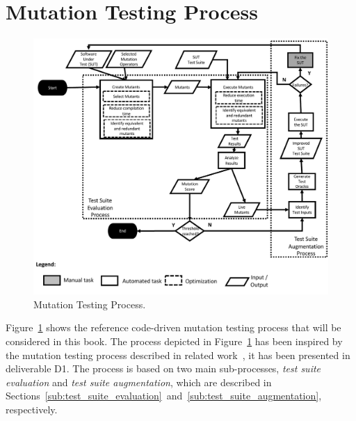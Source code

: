 
\section{Mutation Testing Process}
\label{sec:process}

	\begin{figure}
	\centering
		\includegraphics[width=\textwidth]{images/process}
		\caption{Mutation Testing Process.}
		\label{fig:code:process}
	\end{figure}

Figure~\ref{fig:code:process} shows the reference code-driven mutation testing process that will be considered in this book. The process depicted in Figure~\ref{fig:code:process} has been inspired by the mutation testing process described in related work~\cite{offutt2001mutation,papadakis2019mutation}, it has been presented in deliverable D1. The process is based on two main sub-processes, \emph{test suite evaluation} and \emph{test suite augmentation}, which are described in Sections~\ref{sub:test_suite_evaluation}~and~\ref{sub:test_suite_augmentation}, respectively.



\endinput

\subsection{Test Suite Evaluation} %
\label{sub:test_suite_evaluation}

